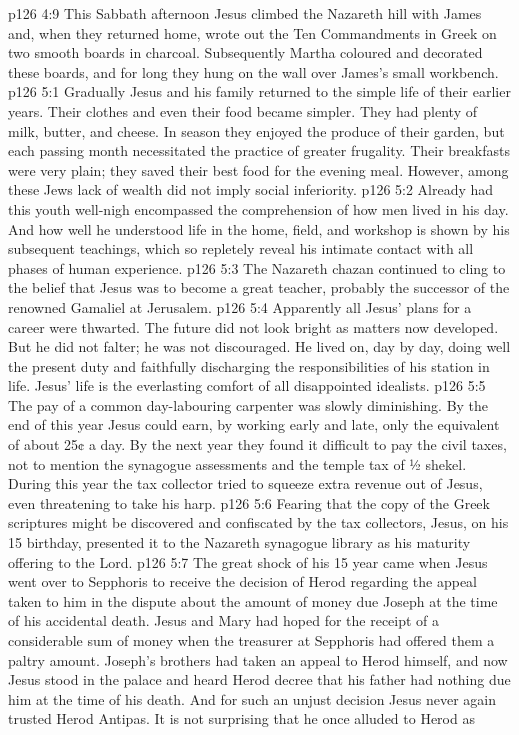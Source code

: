\vs p126 4:9 This Sabbath afternoon Jesus climbed the Nazareth hill with James and, when they returned home, wrote out the Ten Commandments in Greek on two smooth boards in charcoal. Subsequently Martha coloured and decorated these boards, and for long they hung on the wall over James’s small workbench.
\vs p126 5:1 Gradually Jesus and his family returned to the simple life of their earlier years. Their clothes and even their food became simpler. They had plenty of milk, butter, and cheese. In season they enjoyed the produce of their garden, but each passing month necessitated the practice of greater frugality. Their breakfasts were very plain; they saved their best food for the evening meal. However, among these Jews lack of wealth did not imply social inferiority.
\vs p126 5:2 Already had this youth well\hyp{}nigh encompassed the comprehension of how men lived in his day. And how well he understood life in the home, field, and workshop is shown by his subsequent teachings, which so repletely reveal his intimate contact with all phases of human experience.
\vs p126 5:3 The Nazareth chazan continued to cling to the belief that Jesus was to become a great teacher, probably the successor of the renowned Gamaliel at Jerusalem.
\vs p126 5:4 \pc Apparently all Jesus’ plans for a career were thwarted. The future did not look bright as matters now developed. But he did not falter; he was not discouraged. He lived on, day by day, doing well the present duty and faithfully discharging the  responsibilities of his station in life. Jesus’ life is the everlasting comfort of all disappointed idealists.
\vs p126 5:5 The pay of a common day\hyp{}labouring carpenter was slowly diminishing. By the end of this year Jesus could earn, by working early and late, only the equivalent of about 25¢ a day. By the next year they found it difficult to pay the civil taxes, not to mention the synagogue assessments and the temple tax of ½ shekel. During this year the tax collector tried to squeeze extra revenue out of Jesus, even threatening to take his harp.
\vs p126 5:6 Fearing that the copy of the Greek scriptures might be discovered and confiscated by the tax collectors, Jesus, on his 15 birthday, presented it to the Nazareth synagogue library as his maturity offering to the Lord.
\vs p126 5:7 \pc The great shock of his 15 year came when Jesus went over to Sepphoris to receive the decision of Herod regarding the appeal taken to him in the dispute about the amount of money due Joseph at the time of his accidental death. Jesus and Mary had hoped for the receipt of a considerable sum of money when the treasurer at Sepphoris had offered them a paltry amount. Joseph’s brothers had taken an appeal to Herod himself, and now Jesus stood in the palace and heard Herod decree that his father had nothing due him at the time of his death. And for such an unjust decision Jesus never again trusted Herod Antipas. It is not surprising that he once alluded to Herod as 
